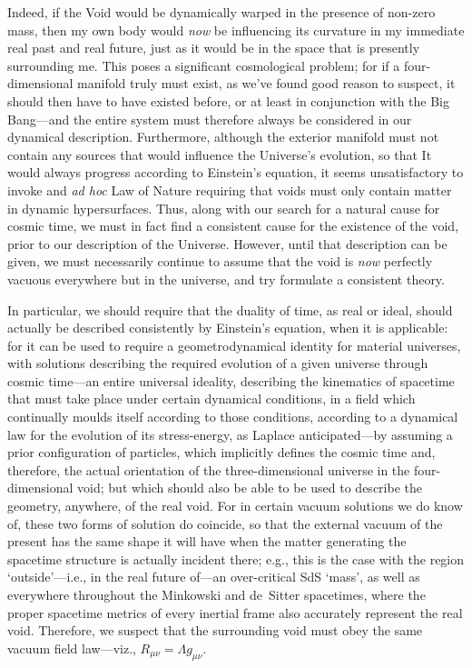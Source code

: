 Indeed, if the Void would be dynamically warped in the presence of non-zero mass, then my own body would \textit{now} be influencing its curvature in my immediate real past and real future, just as it would be in the space that is presently surrounding me. This poses a significant cosmological problem; for if a four-dimensional manifold truly must exist, as we've found good reason to suspect, it should then have to have existed before, or at least in conjunction with the Big Bang---and the entire system must therefore always be considered in our dynamical description. Furthermore, although the exterior manifold must not contain any sources that would influence the Universe's evolution, so that It would always progress according to Einstein's equation, it seems unsatisfactory to invoke and \textit{ad hoc} Law of Nature requiring that voids must only contain matter in dynamic hypersurfaces. Thus, along with our search for a natural cause for cosmic time, we must in fact find a consistent cause for the existence of the void, prior to our description of the Universe. However, until that description can be given, we must necessarily continue to assume that the void is \textit{now} perfectly vacuous everywhere but in the universe, and try formulate a consistent theory.

In particular, we should require that the duality of time, as real or ideal, should actually be described consistently by Einstein's equation, when it is applicable: for it can be used to require a geometrodynamical identity for material universes, with solutions describing the required evolution of a given universe through cosmic time---an entire universal ideality, describing the kinematics of spacetime that must take place under certain dynamical conditions, in a field which continually moulds itself according to those conditions, according to a dynamical law for the evolution of its stress-energy, as Laplace anticipated---by assuming a prior configuration of particles, which implicitly defines the cosmic time and, therefore, the actual orientation of the three-dimensional universe in the four-dimensional void; but which should also be able to be used to describe the geometry, anywhere, of the real void. For in certain vacuum solutions we do know of, these two forms of solution do coincide, so that the external vacuum of the present has the same shape it will have when the matter generating the spacetime structure is actually incident there; e.g., this is the case with the region `outside'---i.e., in the real future of---an over-critical SdS `mass', as well as everywhere throughout the Minkowski and de~Sitter spacetimes, where the proper spacetime metrics of every inertial frame also accurately represent the real void. Therefore, we suspect that the surrounding void must obey the same vacuum field law---viz., $R_{\mu\nu}={\Lambda}g_{\mu\nu}$. 

